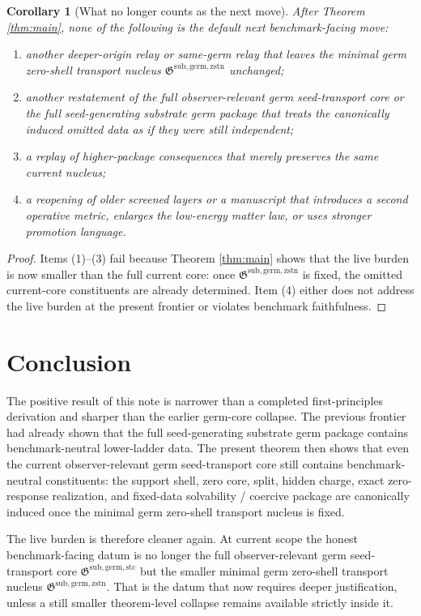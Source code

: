 \documentclass[11pt]{article}
\newcommand{\GermTransportCore}{\mathfrak G^{\mathrm{sub,germ,stc}}}
\newcommand{\GermNucleus}{\mathfrak G^{\mathrm{sub,germ,zstn}}}
\newtheorem{corollary}{Corollary}
\begin{document}
\begin{corollary}[What no longer counts as the next move]
\label{cor:screened}
After Theorem \ref{thm:main}, none of the following is the default next benchmark-facing move:
\begin{enumerate}
    \item another deeper-origin relay or same-germ relay that leaves the minimal germ zero-shell transport nucleus \(\GermNucleus\) unchanged;
    \item another restatement of the full observer-relevant germ seed-transport core or the full seed-generating substrate germ package that treats the canonically induced omitted data as if they were still independent;
    \item a replay of higher-package consequences that merely preserves the same current nucleus;
    \item a reopening of older screened layers or a manuscript that introduces a second operative metric, enlarges the low-energy matter law, or uses stronger promotion language.
\end{enumerate}
\end{corollary}

\begin{proof}
Items (1)--(3) fail because Theorem \ref{thm:main} shows that the live burden is now smaller than the full current core: once \(\GermNucleus\) is fixed, the omitted current-core constituents are already determined. Item (4) either does not address the live burden at the present frontier or violates benchmark faithfulness.
\end{proof}

\section{Conclusion}

The positive result of this note is narrower than a completed first-principles derivation and sharper than the earlier germ-core collapse. The previous frontier had already shown that the full seed-generating substrate germ package contains benchmark-neutral lower-ladder data. The present theorem then shows that even the current observer-relevant germ seed-transport core still contains benchmark-neutral constituents: the support shell, zero core, split, hidden charge, exact zero-response realization, and fixed-data solvability / coercive package are canonically induced once the minimal germ zero-shell transport nucleus is fixed.

The live burden is therefore cleaner again. At current scope the honest benchmark-facing datum is no longer the full observer-relevant germ seed-transport core \(\GermTransportCore\) but the smaller minimal germ zero-shell transport nucleus \(\GermNucleus\). That is the datum that now requires deeper justification, unless a still smaller theorem-level collapse remains available strictly inside it.
\end{document}
